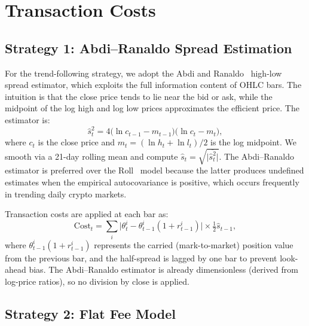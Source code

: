 \documentclass[11pt,a4paper]{article}
\newcommand{\abs}[1]{\lvert #1 \rvert}
\begin{document}
\section{Transaction Costs}
\label{sec:costs}

\subsection{Strategy 1: Abdi--Ranaldo Spread Estimation}

For the trend-following strategy, we adopt the Abdi and Ranaldo~\cite{abdi2017} high-low spread estimator, which exploits the full information content of OHLC bars.  The intuition is that the close price tends to lie near the bid or ask, while the midpoint of the log high and log low prices approximates the efficient price.  The estimator is:
\begin{equation}
  \hat{s}^2_t = 4 \bigl(\ln c_{t-1} - m_{t-1}\bigr)\bigl(\ln c_t - m_t\bigr),
  \label{eq:abdi-ranaldo}
\end{equation}
where $c_t$ is the close price and $m_t = (\ln h_t + \ln l_t)/2$ is the log midpoint.  We smooth via a 21-day rolling mean and compute $\hat{s}_t = \sqrt{\abs{\overline{\hat{s}^2_t}}}$.  The Abdi--Ranaldo estimator is preferred over the Roll~\cite{roll1984} model because the latter produces undefined estimates when the empirical autocovariance is positive, which occurs frequently in trending daily crypto markets.

Transaction costs are applied at each bar as:
\begin{equation}
  \text{Cost}_t = \sum_i \abs{\theta^i_t - \theta^i_{t-1}(1 + r^i_{t-1})} \times \tfrac{1}{2}\hat{s}_{t-1},
  \label{eq:cost}
\end{equation}
where $\theta^i_{t-1}(1 + r^i_{t-1})$ represents the carried (mark-to-market) position value from the previous bar, and the half-spread is lagged by one bar to prevent look-ahead bias.  The Abdi--Ranaldo estimator is already dimensionless (derived from log-price ratios), so no division by close is applied.

\subsection{Strategy 2: Flat Fee Model}
\end{document}
